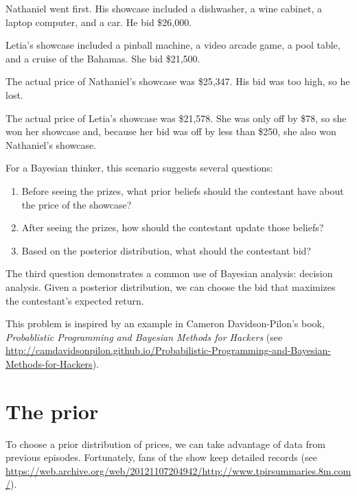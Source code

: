 \documentclass[12pt]{book}
\theoremstyle{exercise}
\begin{document}

Nathaniel went first.  His showcase included a dishwasher, a wine
cabinet, a laptop computer, and a car.  He bid \$26,000.

Letia's showcase included a pinball machine, a video arcade game, a
pool table, and a cruise of the Bahamas.  She bid \$21,500.

The actual price of Nathaniel's showcase was \$25,347.  His bid
was too high, so he lost.

The actual price of Letia's showcase was \$21,578.  She was only
off by \$78, so she won her showcase and, because
her bid was off by less than \$250, she also won Nathaniel's
showcase.

For a Bayesian thinker, this scenario suggests several questions:

\begin{enumerate}

\item Before seeing the prizes, what prior beliefs should the
  contestant have about the price of the showcase?

\item After seeing the prizes, how should the contestant update
  those beliefs?

\item Based on the posterior distribution, what should the
  contestant bid?

\end{enumerate}

The third question demonstrates a common use of Bayesian analysis:
decision analysis.  Given a posterior distribution, we can choose
the bid that maximizes the contestant's expected return.


This problem is inspired by an example in Cameron Davidson-Pilon's
book, {\it Probablistic Programming and Bayesian Methods for Hackers}
(see \url{http://camdavidsonpilon.github.io/Probabilistic-Programming-and-Bayesian-Methods-for-Hackers}).



\section{The prior}

To choose a prior distribution of prices, we can take advantage
of data from previous episodes.
Fortunately, fans of the show keep detailed records (see \url{https://web.archive.org/web/20121107204942/http://www.tpirsummaries.8m.com/}).
\end{document}
